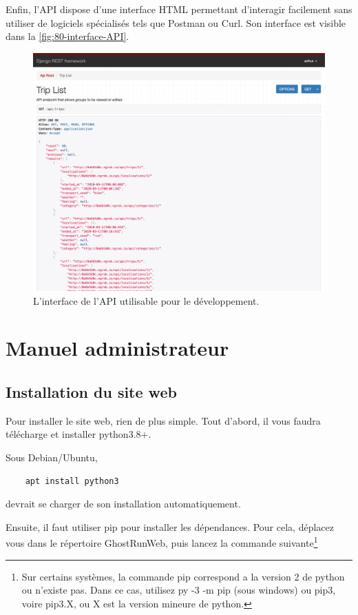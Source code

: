 Enfin, l'\gls{API} dispose d'une interface HTML permettant d'interagir facilement sans utiliser de logiciels spécialisés tels que Postman ou Curl. Son interface est visible dans la \autoref{fig:80-interface-API}.

\begin{figure}[h]
    \centering
    \includegraphics[keepaspectratio, width=2\textwidth/2, height=2\textheight/5]{ima/interface-api}
    \caption{L'interface de l'API utilisable pour le développement.}
    \label{fig:80-interface-API}
\end{figure}


\chapter{Manuel administrateur}


\section{Installation du site web}

Pour installer le site web, rien de plus simple. Tout d'abord, il vous faudra télécharge et installer python3.8+.

Sous Debian/Ubuntu,
\begin{verbatim}
    apt install python3
\end{verbatim}
devrait se charger de son installation automatiquement.

Ensuite, il faut utiliser pip pour installer les dépendances. Pour cela, déplacez vous dans le répertoire GhostRunWeb, puis lancez la commande suivante\footnote{Sur certains systèmes, la commande pip correspond a la version 2 de python ou n'existe pas. Dans ce cas, utilisez py -3 -m pip (sous windows) ou pip3, voire pip3.X, ou X est la version mineure de python.}

